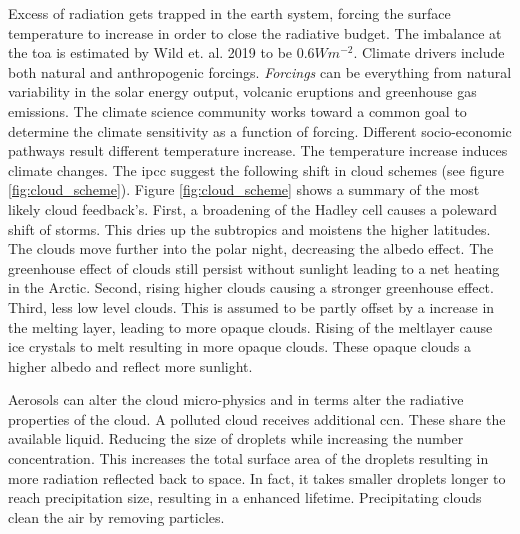 Excess of radiation gets trapped in the earth system, forcing the surface temperature to increase in order to close the radiative budget. The imbalance at the \acrfull{toa} is estimated by Wild et. al. 2019 to be $0.6W m^{-2}$. 
Climate drivers include both natural and anthropogenic forcings. \textit{Forcings} can be everything from natural variability in the solar energy output, volcanic eruptions and greenhouse gas emissions. The climate science community works toward a common goal to determine the climate sensitivity as a function of forcing. Different socio-economic pathways result different temperature increase. The temperature increase induces climate changes. The \acrfull{ipcc} suggest the following shift in cloud schemes (see figure \ref{fig:cloud_scheme}). Figure \ref{fig:cloud_scheme} shows a summary of the most likely cloud feedback's. First, a broadening of the Hadley cell causes a poleward shift of storms. This dries up the subtropics and moistens the higher latitudes. The clouds move further into the polar night, decreasing the albedo effect. The greenhouse effect of clouds still persist without sunlight leading to a net heating in the Arctic. Second, rising higher clouds causing a stronger greenhouse effect. Third, less low level clouds. This is assumed to be partly offset by a increase in the melting layer, leading to more opaque clouds. Rising of the meltlayer cause ice crystals to melt resulting in more opaque clouds. These opaque clouds a higher albedo and reflect more sunlight. 

Aerosols can alter the cloud micro-physics and in terms alter the radiative properties of the cloud. A polluted cloud receives additional \acrshort{ccn}. These share the available liquid. Reducing the size of droplets while increasing the number concentration. This increases the total surface area of the droplets resulting in more radiation reflected back to space. In fact, it takes smaller droplets longer to reach precipitation size, resulting in a enhanced lifetime. Precipitating clouds clean the air by removing particles. 
